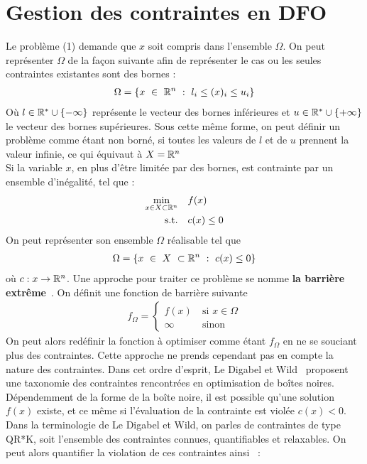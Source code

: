 \section{Gestion des contraintes en DFO}\label{sec:gcd}
Le problème (1) demande que $x$ soit compris dans l'ensemble $\Omega$. On peut représenter $\Omega$ de la façon suivante afin de représenter le cas ou les seules contraintes existantes sont des bornes : 
\begin{gather*}
\Omega = \{x\ \in\ \mathbb{R}^n\ :\ l_i \leq (x)_i \leq u_i\}\\
\end{gather*}
Où $l \in \mathbb{R}^*\cup\{-\infty\}$ représente le vecteur des bornes inférieures et $u \in \mathbb{R}^*\cup\{+\infty\}$ le vecteur des bornes supérieures. Sous cette même forme, on peut définir un problème comme étant non borné, si toutes les valeurs de $l$ et de $u$ prennent la valeur infinie, ce qui équivaut à $ X = \mathbb{R} ^n$ \\
Si la variable $x$, en plus d'être limitée par des bornes, est contrainte par un ensemble d'inégalité, tel que : 
\begin{equation*}
\begin{aligned}
\underset{x\in X \subset \mathbb{R} ^n}{\min}& & & f(x)\\
\text{s.t.}& & & c(x) \leq 0\\
\end{aligned}
\end{equation*}
On peut représenter son ensemble $\Omega$ réalisable tel que
\begin{gather*}
\Omega = \{x~\in~X~\subset \mathbb{R} ^n~:~ c(x) \leq 0\}
\end{gather*}
où $c:x\rightarrow \mathbb{R} ^n$. Une approche pour traiter ce problème se nomme \textbf{la barrière extrême}~\cite{AuDe2006}. On définit une fonction de barrière suivante
\begin{align*}
f_\Omega = \begin{cases}
f(x)~ &\text{si $x \in \Omega$}\\
\infty~ &\text{sinon}
\end{cases}
\end{align*}
On peut alors redéfinir la fonction à optimiser comme étant $f_\Omega$ en ne se souciant plus des contraintes. Cette approche ne prends cependant pas en compte la nature des contraintes. Dans cet ordre d'esprit, Le Digabel et Wild~\cite{LedWild2015} proposent une taxonomie des contraintes rencontrées en optimisation de boîtes noires. Dépendemment de la forme de la boîte noire, il est possible qu'une solution $f(x)$ existe, et ce même si l'évaluation de la contrainte est violée $c(x)<0$. Dans la terminologie de Le Digabel et Wild, on parles de contraintes de type \textsf{QR*K}, soit l'ensemble des contraintes connues, quantifiables et relaxables. On peut alors quantifier la violation de ces contraintes ainsi~\cite{AuHa2018} : 
